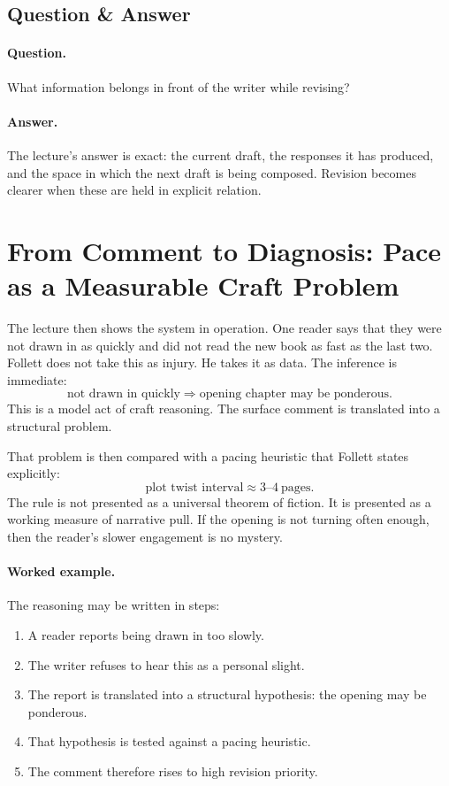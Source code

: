 \subsection{Question \& Answer}

\paragraph{Question.} What information belongs in front of the writer while revising?

\paragraph{Answer.} The lecture's answer is exact: the current draft, the responses it has produced, and the space in which the next draft is being composed. Revision becomes clearer when these are held in explicit relation.

\section{From Comment to Diagnosis: Pace as a Measurable Craft Problem}

The lecture then shows the system in operation. One reader says that they were not drawn in as quickly and did not read the new book as fast as the last two. Follett does not take this as injury. He takes it as data. The inference is immediate:
\begin{equation}
\text{not drawn in quickly} \Rightarrow \text{opening chapter may be ponderous}.
\end{equation}
This is a model act of craft reasoning. The surface comment is translated into a structural problem.

That problem is then compared with a pacing heuristic that Follett states explicitly:
\begin{equation}
\text{plot twist interval} \approx 3\text{--}4 \ \text{pages}.
\end{equation}
The rule is not presented as a universal theorem of fiction. It is presented as a working measure of narrative pull. If the opening is not turning often enough, then the reader's slower engagement is no mystery.

\paragraph{Worked example.} The reasoning may be written in steps:
\begin{enumerate}
\item A reader reports being drawn in too slowly.
\item The writer refuses to hear this as a personal slight.
\item The report is translated into a structural hypothesis: the opening may be ponderous.
\item That hypothesis is tested against a pacing heuristic.
\item The comment therefore rises to high revision priority.
\end{enumerate}

